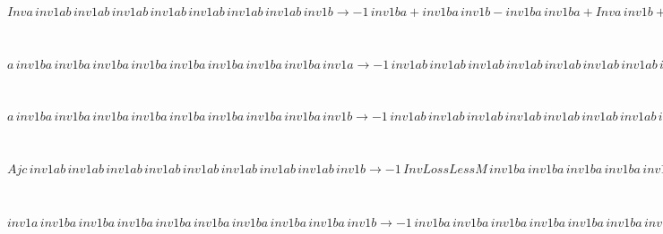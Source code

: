 \documentclass[rep10,leqno]{report}
\begin{document}
\begin{minipage}{6in}
$
Inva\,
 inv1ab\,
 inv1ab\,
 inv1ab\,
 inv1ab\,
 inv1ab\,
 inv1ab\,
 inv1ab\,
 inv1b\rightarrow -1\,
 inv1ba + inv1ba\,
 inv1b - inv1ba\,
 inv1ba + Inva\,
 inv1b + inv1ba\,
 inv1ba\,
 inv1b - inv1ba\,
 inv1ba\,
 inv1ba + inv1ba\,
 inv1ba\,
 inv1ba\,
 inv1b - inv1ba\,
 inv1ba\,
 inv1ba\,
 inv1ba + inv1ba\,
 inv1ba\,
 inv1ba\,
 inv1ba\,
 inv1b - inv1ba\,
 inv1ba\,
 inv1ba\,
 inv1ba\,
 inv1ba + inv1ba\,
 inv1ba\,
 inv1ba\,
 inv1ba\,
 inv1ba\,
 inv1b - inv1ba\,
 inv1ba\,
 inv1ba\,
 inv1ba\,
 inv1ba\,
 inv1ba + inv1ba\,
 inv1ba\,
 inv1ba\,
 inv1ba\,
 inv1ba\,
 inv1ba\,
 inv1b - inv1ba\,
 inv1ba\,
 inv1ba\,
 inv1ba\,
 inv1ba\,
 inv1ba\,
 inv1ba + inv1ba\,
 inv1ba\,
 inv1ba\,
 inv1ba\,
 inv1ba\,
 inv1ba\,
 inv1ba\,
 inv1b
$
\end{minipage}\medskip \\
\begin{minipage}{6in}
$
a\,
 inv1ba\,
 inv1ba\,
 inv1ba\,
 inv1ba\,
 inv1ba\,
 inv1ba\,
 inv1ba\,
 inv1ba\,
 inv1a\rightarrow -1\,
 inv1ab\,
 inv1ab\,
 inv1ab\,
 inv1ab\,
 inv1ab\,
 inv1ab\,
 inv1ab\,
 inv1ab + inv1ab\,
 inv1ab\,
 inv1ab\,
 inv1ab\,
 inv1ab\,
 inv1ab\,
 inv1ab\,
 inv1ab\,
 inv1a
$
\end{minipage}\medskip \\
\begin{minipage}{6in}
$
a\,
 inv1ba\,
 inv1ba\,
 inv1ba\,
 inv1ba\,
 inv1ba\,
 inv1ba\,
 inv1ba\,
 inv1ba\,
 inv1b\rightarrow -1\,
 inv1ab\,
 inv1ab\,
 inv1ab\,
 inv1ab\,
 inv1ab\,
 inv1ab\,
 inv1ab\,
 inv1b + a\,
 inv1ba\,
 inv1ba\,
 inv1ba\,
 inv1ba\,
 inv1ba\,
 inv1ba\,
 inv1ba\,
 inv1ba + inv1ab\,
 inv1ab\,
 inv1ab\,
 inv1ab\,
 inv1ab\,
 inv1ab\,
 inv1ab\,
 inv1ab\,
 inv1b
$
\end{minipage}\medskip \\
\begin{minipage}{6in}
$
Ajc\,
 inv1ab\,
 inv1ab\,
 inv1ab\,
 inv1ab\,
 inv1ab\,
 inv1ab\,
 inv1ab\,
 inv1ab\,
 inv1b\rightarrow -1\,
 InvLossLessM\,
 inv1ba\,
 inv1ba\,
 inv1ba\,
 inv1ba\,
 inv1ba\,
 inv1ba\,
 inv1ba\,
 inv1ba + InvLossLessM\,
 inv1ba\,
 inv1ba\,
 inv1ba\,
 inv1ba\,
 inv1ba\,
 inv1ba\,
 inv1ba\,
 inv1ba\,
 inv1b
$
\end{minipage}\medskip \\
\begin{minipage}{6in}
$
inv1a\,
 inv1ba\,
 inv1ba\,
 inv1ba\,
 inv1ba\,
 inv1ba\,
 inv1ba\,
 inv1ba\,
 inv1ba\,
 inv1b\rightarrow -1\,
 inv1ba\,
 inv1ba\,
 inv1ba\,
 inv1ba\,
 inv1ba\,
 inv1ba\,
 inv1ba\,
 inv1ba - inv1a\,
 inv1ab\,
 inv1ab\,
 inv1ab\,
 inv1ab\,
 inv1ab\,
 inv1ab\,
 inv1ab\,
 inv1b + inv1a\,
 inv1ba\,
 inv1ba\,
 inv1ba\,
 inv1ba\,
 inv1ba\,
 inv1ba\,
 inv1ba\,
 inv1ba + inv1ba\,
 inv1ba\,
 inv1ba\,
 inv1ba\,
 inv1ba\,
 inv1ba\,
 inv1ba\,
 inv1ba\,
 inv1b + inv1a\,
 inv1ab\,
 inv1ab\,
 inv1ab\,
 inv1ab\,
 inv1ab\,
 inv1ab\,
 inv1ab\,
 inv1ab\,
 inv1b
$
\end{minipage}\medskip \\
\end{document}
